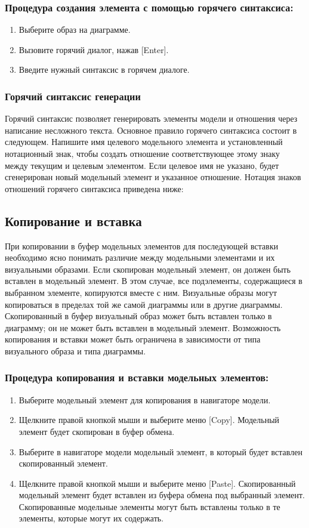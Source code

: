 \documentclass[a4paper,12pt]{extreport}
\begin{document}
\subsubsection*{Процедура создания элемента с помощью горячего синтаксиса:}
\begin{enumerate}
	\item Выберите образ на диаграмме.
	\item Вызовите горячий диалог, нажав [Enter].
	\item Введите нужный синтаксис в горячем диалоге.
\end{enumerate}

\subsubsection*{Горячий синтаксис генерации}
Горячий синтаксис позволяет генерировать элементы модели и отношения через написание
несложного текста. Основное правило горячего синтаксиса состоит в следующем. Напишите имя
целевого модельного элемента и установленный нотационный знак, чтобы создать отношение
соответствующее этому знаку между текущим и целевым элементом. Если целевое имя не указано,
будет сгенерирован новый модельный элемент и указанное отношение. Нотация знаков отношений горячего синтаксиса приведена ниже:

\subsection*{Копирование и вставка}
При копировании в буфер модельных элементов для последующей вставки необходимо ясно
понимать различие между модельными элементами и их визуальными образами. Если скопирован
модельный элемент, он должен быть вставлен в модельный элемент. В этом случае, все
подэлементы, содержащиеся в выбранном элементе, копируются вместе с ним. Визуальные образы
могут копироваться в пределах той же самой диаграммы или в другие диаграммы. Скопированный
в буфер визуальный образ может быть вставлен только в диаграмму; он не может быть вставлен в
модельный элемент. Возможность копирования и вставки может быть ограничена в зависимости от
типа визуального образа и типа диаграммы.

\subsubsection*{Процедура копирования и вставки модельных элементов:}
\begin{enumerate}
	\item Выберите модельный элемент для копирования в навигаторе модели.
	\item  Щелкните правой кнопкой мыши и выберите меню [Copy]. Модельный элемент будет
	скопирован в буфер обмена.
	\item Выберите в навигаторе модели модельный элемент, в который будет вставлен
	скопированный элемент.
	\item Щелкните правой кнопкой мыши и выберите меню [Paste]. Скопированный модельный
	элемент будет вставлен из буфера обмена под выбранный элемент. Скопированные модельные элементы могут быть вставлены только в те элементы, которые могут их содержать.
\end{enumerate}
\end{document}
